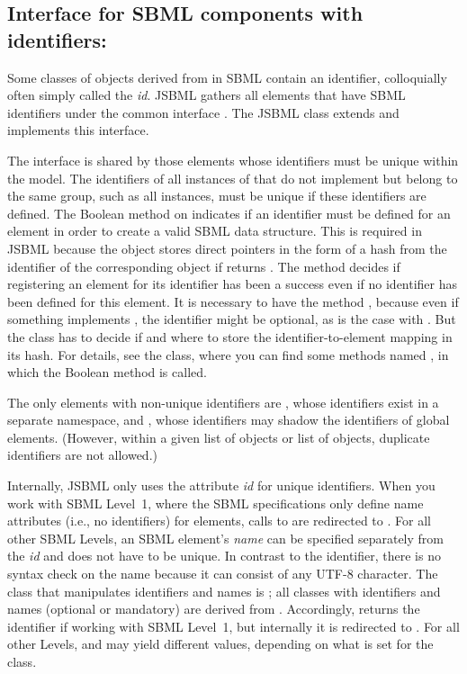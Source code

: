 \subsection{Interface for SBML components with identifiers: }

Some classes of objects derived from \SBase in SBML contain an identifier,
colloquially often simply called the \emph{id}. JSBML gathers all elements
that have SBML identifiers under the common interface \NamedSBase. The JSBML
class \AbstractNamedSBase extends \AbstractSBase and implements this
interface.  

The interface \UniqueNamedSBase is shared by those elements whose
identifiers must be unique within the model. The identifiers of all instances
of \NamedSBase that do not implement \UniqueNamedSBase but belong to the same
group, such as all \UnitDefinition instances, must be unique if these identifiers are
defined. The Boolean method  on \NamedSBase indicates
if an identifier must be defined for an element in order to create a valid
SBML data structure.  This is required in JSBML because the \Model object
stores direct pointers in the form of a hash from the identifier of the
corresponding object if  returns . 
The method decides if registering an element for its identifier has been a
success even if no identifier has been defined for this element. It is
necessary to have the method , because even if something
implements \UniqueNamedSBase, the identifier might be optional, as is the
case with \SimpleSpeciesReference. But the \Model class has to decide if and
where to store the identifier-to-element mapping in its hash. For details, see
the \Model class, where you can find some methods named , in
which the Boolean method is called.

The only elements with non-unique identifiers are \UnitDefinition, whose
identifiers exist in a separate namespace, and \LocalParameter, whose
identifiers may shadow the identifiers of global elements. (However, within a
given list of \UnitDefinition objects or list of \LocalParameter objects,
duplicate identifiers are not allowed.)

Internally, JSBML only uses the attribute \emph{id} for unique identifiers.
When you work with SBML Level~1, where the SBML specifications only define
name attributes (i.e., no identifiers) for elements, calls to
 are redirected to . For all other
SBML Levels, an SBML element's \emph{name} can be specified separately from
the \emph{id} and does not have to be unique. In contrast to the identifier,
there is no syntax check on the name because it can consist of any UTF-8
character. The class that manipulates identifiers and names is
\AbstractNamedSBase; all classes with identifiers and names (optional
or mandatory) are derived from \AbstractNamedSBase. Accordingly,
 returns the identifier if working with SBML Level~1, but
internally it is redirected to . For all other Levels,
 and  may yield different values, depending on
what is set for the class.


